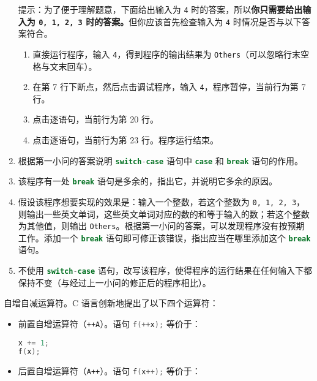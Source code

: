 \begin{problemset}
\begin{enumerate}
		提示：为了便于理解题意，下面给出输入为 \lstinline{4} 时的答案，所以\textbf{你只需要给出输入为 \lstinline{0, 1, 2, 3} 时的答案。}但你应该首先检查输入为 \lstinline{4} 时情况是否与以下答案符合。

		\begin{enumerate}
			\item 直接运行程序，输入 \lstinline{4}，得到程序的输出结果为 \lstinline{Others}（可以忽略行末空格与文末回车）。
			\item 在第 7 行下断点，然后点击调试程序，输入 \lstinline{4}，程序暂停，当前行为第 7 行。
			\item 点击逐语句，当前行为第 20 行。
			\item 点击逐语句，当前行为第 23 行。程序运行结束。
		\end{enumerate}

		\item 根据第一小问的答案说明 \lstinline[language=c]{switch-case} 语句中 \lstinline[language=c]{case} 和 \lstinline[language=c]{break} 语句的作用。

		\item 该程序有一处 \lstinline[language=c]{break} 语句是多余的，指出它，并说明它多余的原因。

		\item 假设该程序想要实现的效果是：输入一个整数，若这个整数为 \lstinline{0, 1, 2, 3}，则输出一些英文单词，这些英文单词对应的数的和等于输入的数；若这个整数为其他值，则输出 \lstinline{Others}。根据第一小问的答案，可以发现程序没有按预期工作。添加一个 \lstinline[language=c]{break} 语句即可修正该错误，指出应当在哪里添加这个 \lstinline[language=c]{break} 语句。

		\item 不使用 \lstinline[language=c]{switch-case} 语句，改写该程序，使得程序的运行结果在任何输入下都保持不变（与经过上一小问的修正后的程序相比）。
	\end{enumerate}

	\item 自增自减运算符。C 语言创新地提出了以下四个运算符：
	\begin{itemize}
		\item 前置自增运算符（\lstinline{++A}）。语句 \lstinline[language=c, moreemph={[2]f}]{f(++x);} 等价于：

		\begin{lstlisting}[language=c, numbers=none, moreemph={[2]f}]
x += 1;
f(x);
		\end{lstlisting}

		\item 后置自增运算符（\lstinline{A++}）。语句 \lstinline[language=c, moreemph={[2]f}]{f(x++);} 等价于：


\end{itemize}
\end{problemset}
